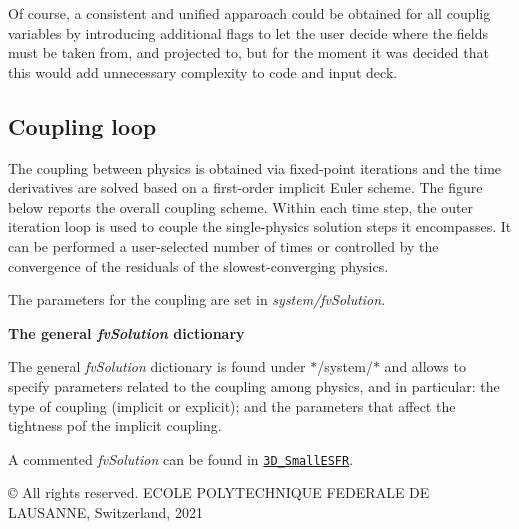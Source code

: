 Of course, a consistent and unified apparoach could be obtained for all couplig variables by introducing additional flags to let the user decide where the fields must be taken from, and projected to, but for the moment it was decided that this would add unnecessary complexity to code and input deck.

\subsection*{Coupling loop}

The coupling between physics is obtained via fixed-\/point iterations and the time derivatives are solved based on a first-\/order implicit Euler scheme. The figure below reports the overall coupling scheme. Within each time step, the outer iteration loop is used to couple the single-\/physics solution steps it encompasses. It can be performed a user-\/selected number of times or controlled by the convergence of the residuals of the slowest-\/converging physics.



The parameters for the coupling are set in {\itshape system/fv\+Solution}.

 {\bfseries The general {\itshape fv\+Solution} dictionary}

The general {\itshape fv\+Solution} dictionary is found under $\ast$/system/$\ast$ and allows to specify parameters related to the coupling among physics, and in particular\+: the type of coupling (implicit or explicit); and the parameters that affect the tightness pof the implicit coupling.

A commented {\itshape fv\+Solution} can be found in \href{https://gitlab.com/foam-for-nuclear/GeN-Foam/-/blob/master/Tutorials/3D_SmallESFR/rootCase/system/fvSolution}{\tt 3\+D\+\_\+\+Small\+E\+S\+FR}. 

© All rights reserved. E\+C\+O\+LE P\+O\+L\+Y\+T\+E\+C\+H\+N\+I\+Q\+UE F\+E\+D\+E\+R\+A\+LE DE L\+A\+U\+S\+A\+N\+NE, Switzerland, 2021 